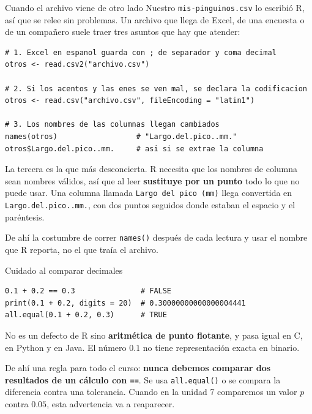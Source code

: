 \documentclass[aspectratio=169,10pt]{beamer}
\newcommand{\Rc}[1]{{\setlength{\fboxsep}{1.6pt}%
  \colorbox{codigoFondo}{\textcolor{codigoTexto}{\texttt{#1}}}}}
\newcommand{\destaca}[1]{%
  \par\vspace{3pt}\noindent
  \colorbox{azulClaro}{%
    \parbox{\dimexpr\linewidth-2\fboxsep\relax}{\vspace{3pt}#1\vspace{3pt}}}%
  \par\vspace{3pt}}
\begin{document}
\begin{frame}[fragile]{Cuando el archivo viene de otro lado}
  Nuestro \texttt{mis-pinguinos.csv} lo escribió R, así que se relee sin problemas. Un
  archivo que llega de Excel, de una encuesta o de un compañero suele traer tres
  asuntos que hay que atender:

  \vspace{2mm}
\begin{lstlisting}
# 1. Excel en espanol guarda con ; de separador y coma decimal
otros <- read.csv2("archivo.csv")

# 2. Si los acentos y las enes se ven mal, se declara la codificacion
otros <- read.csv("archivo.csv", fileEncoding = "latin1")

# 3. Los nombres de las columnas llegan cambiados
names(otros)                  # "Largo.del.pico..mm."
otros$Largo.del.pico..mm.     # asi si se extrae la columna
\end{lstlisting}

  \vspace{0.2cm}
  \destaca{\small La tercera es la que más desconcierta. R necesita que los nombres de
  columna sean nombres válidos, así que al leer \textbf{sustituye por un punto} todo lo
  que no puede usar. Una columna llamada \texttt{Largo del pico (mm)} llega convertida en
  \Rc{Largo.del.pico..mm.}, con dos puntos seguidos donde estaban el espacio y el
  paréntesis.

  \vspace{0.15cm}
  De ahí la costumbre de correr \Rc{names()} después de cada lectura y usar el nombre que
  R reporta, no el que traía el archivo.}
\end{frame}




\begin{frame}[fragile]{Cuidado al comparar decimales}
\begin{lstlisting}
0.1 + 0.2 == 0.3               # FALSE
print(0.1 + 0.2, digits = 20)  # 0.30000000000000004441
all.equal(0.1 + 0.2, 0.3)      # TRUE
\end{lstlisting}

  \vspace{0.3cm}
  \destaca{No es un defecto de R sino \textbf{aritmética de punto flotante}, y pasa
  igual en C, en Python y en Java. El número $0.1$ no tiene representación exacta
  en binario.

  \vspace{0.2cm}
  De ahí una regla para todo el curso: \textbf{nunca debemos comparar dos resultados
  de un cálculo con \Rc{==}}. Se usa \Rc{all.equal()} o se compara la diferencia contra
  una tolerancia. Cuando en la unidad 7 comparemos un valor $p$ contra $0.05$,
  esta advertencia va a reaparecer.}
\end{frame}
\end{document}
